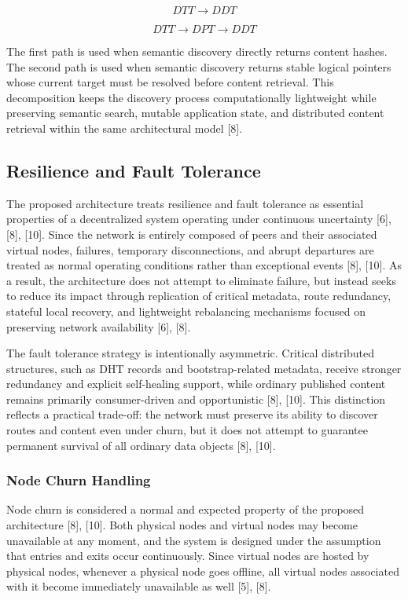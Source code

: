 \documentclass[12pt,a4paper]{article}
\begin{document}
\[
DTT \rightarrow DDT
\]

\[
DTT \rightarrow DPT \rightarrow DDT
\]

The first path is used when semantic discovery directly returns content hashes. The second path is used when semantic discovery returns stable logical pointers whose current target must be resolved before content retrieval. This decomposition keeps the discovery process computationally lightweight while preserving semantic search, mutable application state, and distributed content retrieval within the same architectural model [8].


\subsection{Resilience and Fault Tolerance}

The proposed architecture treats resilience and fault tolerance as essential properties of a decentralized system operating under continuous uncertainty [6], [8], [10]. Since the network is entirely composed of peers and their associated virtual nodes, failures, temporary disconnections, and abrupt departures are treated as normal operating conditions rather than exceptional events [8], [10]. As a result, the architecture does not attempt to eliminate failure, but instead seeks to reduce its impact through replication of critical metadata, route redundancy, stateful local recovery, and lightweight rebalancing mechanisms focused on preserving network availability [6], [8].

The fault tolerance strategy is intentionally asymmetric. Critical distributed structures, such as DHT records and bootstrap-related metadata, receive stronger redundancy and explicit self-healing support, while ordinary published content remains primarily consumer-driven and opportunistic [8], [10]. This distinction reflects a practical trade-off: the network must preserve its ability to discover routes and content even under churn, but it does not attempt to guarantee permanent survival of all ordinary data objects [8], [10].

\subsubsection{Node Churn Handling}

Node churn is considered a normal and expected property of the proposed architecture [8], [10]. Both physical nodes and virtual nodes may become unavailable at any moment, and the system is designed under the assumption that entries and exits occur continuously. Since virtual nodes are hosted by physical nodes, whenever a physical node goes offline, all virtual nodes associated with it become immediately unavailable as well [5], [8].
\end{document}
